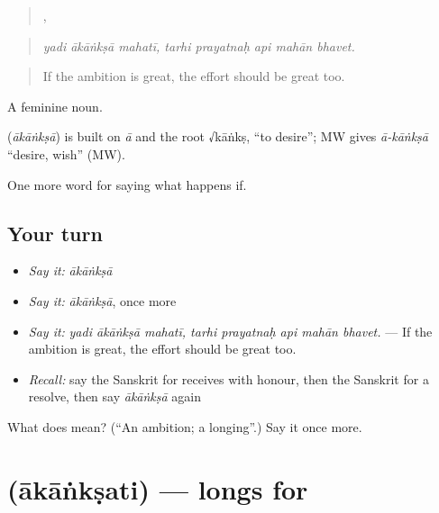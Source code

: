 \begin{quote}
  ,     
\end{quote}

\begin{quote}
\emph{yadi ākāṅkṣā mahatī, tarhi prayatnaḥ api mahān bhavet.}
\end{quote}

\begin{quote}
If the ambition is great, the effort should be great too.
\end{quote}

A feminine noun.

\begin{cousinweb}
\textbf{} (\emph{ākāṅkṣā}) is built on \emph{ā} and the root √kāṅkṣ, \textquotedblleft{}to desire\textquotedblright{}; MW gives \emph{ā-kāṅkṣā} \textquotedblleft{}desire, wish\textquotedblright{} (MW).
\end{cousinweb}

\begin{grammarlens}[title={What you've built}]
One more word for saying what happens if.
\end{grammarlens}

\subsection*{Your turn}
\begin{itemize}
\raggedright
  \item \emph{Say it:} \emph{ākāṅkṣā}
  \item \emph{Say it:} \emph{ākāṅkṣā}, once more
  \item \emph{Say it:} \emph{yadi ākāṅkṣā mahatī, tarhi prayatnaḥ api mahān bhavet.} — If the ambition is great, the effort should be great too.
  \item \emph{Recall:} say the Sanskrit for receives with honour, then the Sanskrit for a resolve, then say \emph{ākāṅkṣā} again
\end{itemize}

\begin{tcolorbox}[breakable,colback=teal!4,colframe=teal!35!black,title={Before you move on}]
What does  mean? (\textquotedblleft{}An ambition; a longing\textquotedblright{}.) Say it once more.
\end{tcolorbox}
\section[\texorpdfstring{\sk{आकांक्षति} (ākāṅkṣati)}{आकांक्षति (ākāṅkṣati)}]{ (ākāṅkṣati) — longs for}

